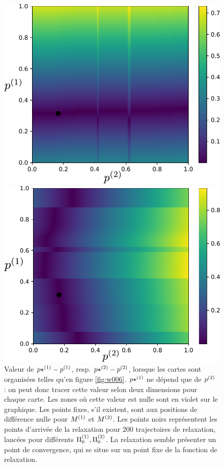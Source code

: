 \begin{figure}
\begin{minipage}{0.5\textwidth}
\centering
\includegraphics[width=\textwidth]{champ_X_006_notraj.pdf}
\end{minipage}
\begin{minipage}{0.5\textwidth}
\centering
\includegraphics[width=\textwidth]{champ_Y_006_notraj.pdf}
\end{minipage}
\caption{Valeur de ${p\star}^{({1})} - p^{({1})}$, resp. ${p\star}^{({2})} - p^{({2})}$, lorsque les cartes sont organisées telles qu'en figure \ref{fig:w006}. ${p\star}^{({1})}$ ne dépend que de $p^{({2})}$ : on peut donc tracer cette valeur selon deux dimensions pour chaque carte. Les zones où cette valeur est nulle sont en violet sur le graphique. Les points fixes, s'il existent, sont aux positions de différence nulle pour $M^{({1})}$ et $M^{({2})}$. Les points noirs représentent les points d'arrivée de la relaxation pour 200 trajectoires de relaxation, lancées pour différents $\Pi_0^{({1})}, \Pi_0^{({2})}$. La relaxation semble présenter un point de convergence, qui se situe sur un point fixe de la fonction de relaxation.}
\label{fig:diff_relax_notraj}
\end{figure}

